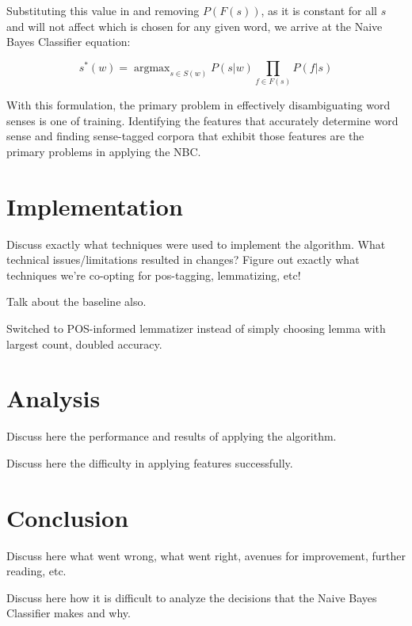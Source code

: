 \documentclass[11pt]{article}
\DeclareMathOperator*{\argmax}{argmax}
\begin{document}
Substituting this value in and removing $P(F(s))$, as it is constant for all $s$ and will not affect which is chosen for any given word, we arrive at the Naive Bayes Classifier equation:

\begin{equation} \label{eq:nbc}
s^*(w) = \argmax_{s \in S(w)} P(s|w)\!\!\prod_{f \in F(s)}\!\!P(f|s)
\end{equation}

With this formulation, the primary problem in effectively disambiguating word senses is one of training. Identifying the features that accurately determine word sense and finding sense-tagged corpora that exhibit those features are the primary problems in applying the NBC.

\section{Implementation}
Discuss exactly what techniques were used to implement the algorithm. What technical issues/limitations resulted in changes? Figure out exactly what techniques we're co-opting for pos-tagging, lemmatizing, etc!

Talk about the baseline also.

Switched to POS-informed lemmatizer instead of simply choosing lemma with largest count, doubled accuracy.

\section{Analysis}
Discuss here the performance and results of applying the algorithm.

Discuss here the difficulty in applying features successfully.

\section{Conclusion}
Discuss here what went wrong, what went right, avenues for improvement, further reading, etc.

Discuss here how it is difficult to analyze the decisions that the Naive Bayes Classifier makes and why.
\end{document}
